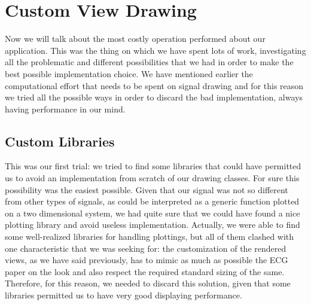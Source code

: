 \section{Custom View Drawing}
Now we will talk about the most costly operation performed about our application. This was the thing on which we have spent lots of work, investigating all the problematic and different possibilities that we had in order to make the best possible implementation choice. We have mentioned earlier the computational effort that needs to be spent on signal drawing and for this reason we tried all the possible ways in order to discard the bad implementation, always having performance in our mind.

\subsection{Custom Libraries}
This was our first trial: we tried to find some libraries that could have permitted us to avoid an implementation from scratch of our drawing classes. For sure this possibility was the easiest possible. Given that our signal was not so different from other types of signals, as could be interpreted as a generic function plotted on a two dimensional system, we had quite sure that we could have found a nice plotting library and avoid useless implementation. Actually, we were able to find some well-realized libraries for handling plottings, but all of them clashed with one characteristic that we was seeking for: the customization of the rendered views, as we have said previously, has to mimic as much as possible the ECG paper on the look and also respect the required standard sizing of the same. Therefore, for this reason, we needed to discard this solution, given that some libraries permitted us to have very good displaying performance.

